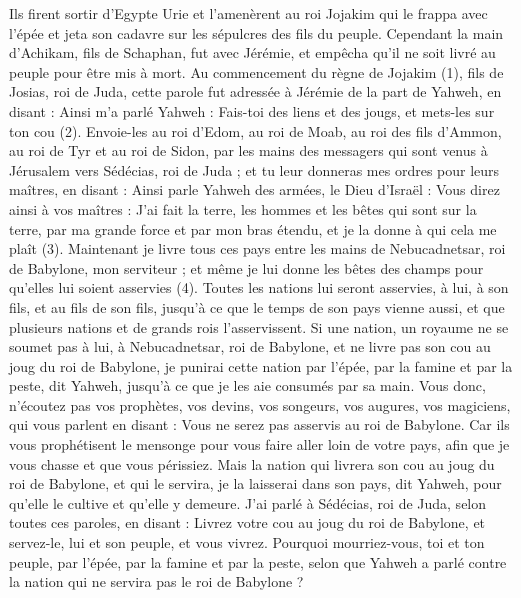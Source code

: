 \begin{multicols}{2}
Ils firent sortir d'Egypte Urie et l'amenèrent au roi Jojakim qui le frappa avec l'épée et jeta son cadavre sur les sépulcres des fils du peuple.
Cependant la main d'Achikam, fils de Schaphan, fut avec Jérémie, et empêcha qu’il ne soit livré au peuple pour être mis à mort.
\VerseOne{}Au commencement du règne de Jojakim\FTNT{} (1), fils de Josias, roi de Juda, cette parole fut adressée à Jérémie de la part de Yahweh, en disant :
Ainsi m’a parlé Yahweh : Fais-toi des liens et des jougs, et mets-les sur ton cou\FTNT{} (2).
Envoie-les au roi d'Edom, au roi de Moab, au roi des fils d’Ammon, au roi de Tyr et au roi de Sidon, par les mains des messagers qui sont venus à Jérusalem vers Sédécias, roi de Juda ;
et tu leur donneras mes ordres pour leurs maîtres, en disant : Ainsi parle Yahweh des armées, le Dieu d'Israël : Vous direz ainsi à vos maîtres :
J'ai fait la terre, les hommes et les bêtes qui sont sur la terre, par ma grande force et par mon bras étendu, et je la donne à qui cela me plaît\FTNT{} (3).
Maintenant je livre tous ces pays entre les mains de Nebucadnetsar, roi de Babylone, mon serviteur ; et même je lui donne les bêtes des champs pour qu'elles lui soient asservies\FTNT{} (4).
Toutes les nations lui seront asservies, à lui, à son fils, et au fils de son fils, jusqu’à ce que le temps de son pays vienne aussi, et que plusieurs nations et de grands rois l'asservissent.
Si une nation, un royaume ne se soumet pas à lui, à Nebucadnetsar, roi de Babylone, et ne livre pas son cou au joug du roi de Babylone, je punirai cette nation par l'épée, par la famine et par la peste, dit Yahweh, jusqu’à ce que je les aie consumés par sa main.
Vous donc, n'écoutez pas vos prophètes, vos devins, vos songeurs, vos augures, vos magiciens, qui vous parlent en disant : Vous ne serez pas asservis au roi de Babylone.
Car ils vous prophétisent le mensonge pour vous faire aller loin de votre pays, afin que je vous chasse et que vous périssiez.
Mais la nation qui livrera son cou au joug du roi de Babylone, et qui le servira, je la laisserai dans son pays, dit Yahweh, pour qu’elle le cultive et qu’elle y demeure.
J’ai parlé à Sédécias, roi de Juda, selon toutes ces paroles, en disant : Livrez votre cou au joug du roi de Babylone, et servez-le, lui et son peuple, et vous vivrez.
Pourquoi mourriez-vous, toi et ton peuple, par l'épée, par la famine et par la peste, selon que Yahweh a parlé contre la nation qui ne servira pas le roi de Babylone ?

\end{multicols}
